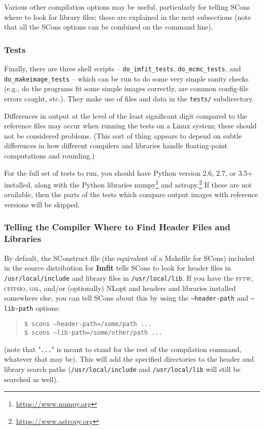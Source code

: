 \documentclass[10pt,a4paper,article]{memoir}
\newcommand{\imfit}{\textbf{Imfit}}
\begin{document}
Various other compilation options may be useful, particularly for telling SCons where
to look for library files; these are explained in the next
subsections (note that all the SCons options can be combined on the command
line).


\subsubsection{Tests}

Finally, there are three shell scripts -- \texttt{do\_imfit\_tests},
\texttt{do\_mcmc\_tests}, and \texttt{do\_makeimage\_tests} -- which can
be run to do some very simple sanity checks (e.g., do the programs fit
some simple images correctly, are common config-file errors caught,
etc.). They make use of files and data in the \texttt{tests/}
subdirectory. 

Differences in output at the level of the least significant digit
compared to the reference files may occur when running the tests on a
Linux system; these should not be considered problems. (This sort of
thing appears to depend on subtle differences in how different compilers
and libraries handle floating-point computations and rounding.)

For the full set of tests to run, you should have Python version 2.6,
2.7, or 3.5+ installed, along with the Python libraries
numpy\footnote{\url{https://www.numpy.org}} and
astropy.\footnote{\url{https://www.astropy.org}} If these are not
available, then the parts of the tests which compare output images with
reference versions will be skipped.



\subsubsection{Telling the Compiler Where to Find Header Files and Libraries}

By default, the SConstruct file (the equivalent of a Makefile for SCons) included
in the source distribution for \imfit{}
tells SCons to look for header files in \texttt{/usr/local/include} and
library files in \texttt{/usr/local/lib}. If you have the \textsc{fftw},
\textsc{cfitsio}, \textsc{gsl}, and/or (optionally) NLopt and headers and
libraries installed somewhere else, you can tell SCons about this by
using the
\texttt{--header-path} and \texttt{--lib-path} options:
\begin{quote}
\texttt{\$ scons --header-path=/some/path ...} \\
\texttt{\$ scons --lib-path=/some/other/path ...}
\end{quote}
(note that "\texttt{...}" is meant to stand for the rest of the compilation command,
whatever that may be). This will add the specified directories to the
header and library search paths (\texttt{/usr/local/include} and \texttt{/usr/local/lib}
will still be searched as well).
\end{document}

